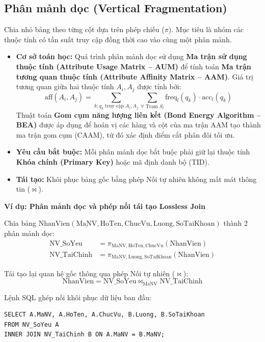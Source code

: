 \documentclass[12pt,a4paper]{report}
\newenvironment{viduBox}[1]{%
    \par\vspace{6pt}\noindent
    \begin{minipage}{\textwidth}
    \begin{mdframed}[style=viduStyle]%
    \noindent\textbf{\color{myblue}Ví dụ: #1}\par\vspace{4pt}\small
}{%
    \end{mdframed}%
    \end{minipage}\par\vspace{6pt}
}
\begin{document}
\subsection{Phân mảnh dọc (Vertical Fragmentation)}
Chia nhỏ bảng theo từng cột dựa trên phép chiếu ($\pi$). Mục tiêu là nhóm các thuộc tính có tần suất truy cập đồng thời cao vào cùng một phân mảnh.
\begin{itemize}
    \item \textbf{Cơ sở toán học:} Quá trình phân mảnh dọc sử dụng \textbf{Ma trận sử dụng thuộc tính (Attribute Usage Matrix -- AUM)} để tính toán \textbf{Ma trận tương quan thuộc tính (Attribute Affinity Matrix -- AAM)}. Giá trị tương quan giữa hai thuộc tính $A_i, A_j$ được tính bởi:
    \[
        \text{aff}(A_i, A_j) = \sum_{k: q_k \text{ truy cập } A_i, A_j} \sum_{\forall \text{ Trạm } S_l} \text{freq}_l(q_k) \cdot \text{acc}_l(q_k)
    \]
    Thuật toán \textbf{Gom cụm năng lượng liên kết (Bond Energy Algorithm -- BEA)} được áp dụng để hoán vị các hàng và cột của ma trận AAM tạo thành ma trận gom cụm (CAAM), từ đó xác định điểm cắt phân đôi tối ưu.
    \item \textbf{Yêu cầu bắt buộc:} Mỗi phân mảnh dọc bắt buộc phải giữ lại thuộc tính \textbf{Khóa chính (Primary Key)} hoặc mã định danh bộ (TID).
    \item \textbf{Tái tạo:} Khôi phục bảng gốc bằng phép Nối tự nhiên không mất mát thông tin ($\bowtie$).
\end{itemize}

\begin{viduBox}{Phân mảnh dọc và phép nối tái tạo Lossless Join}
Chia bảng $\text{NhanVien}(\underline{\text{MaNV}}, \text{HoTen}, \text{ChucVu}, \text{Luong}, \text{SoTaiKhoan})$ thành 2 phân mảnh dọc:
\begin{align*}
    \text{NV\_SoYeu} &= \pi_{\text{MaNV}, \text{HoTen}, \text{ChucVu}}(\text{NhanVien}) \\
    \text{NV\_TaiChinh} &= \pi_{\text{MaNV}, \text{Luong}, \text{SoTaiKhoan}}(\text{NhanVien})
\end{align*}

Tái tạo lại quan hệ gốc thông qua phép Nối tự nhiên ($\bowtie$):
\[
    \text{NhanVien} = \text{NV\_SoYeu} \bowtie_{\text{MaNV}} \text{NV\_TaiChinh}
\]

Lệnh SQL ghép nối khôi phục dữ liệu ban đầu:
\begin{lstlisting}
SELECT A.MaNV, A.HoTen, A.ChucVu, B.Luong, B.SoTaiKhoan
FROM NV_SoYeu A 
INNER JOIN NV_TaiChinh B ON A.MaNV = B.MaNV;
\end{lstlisting}
\end{viduBox}
\end{document}
